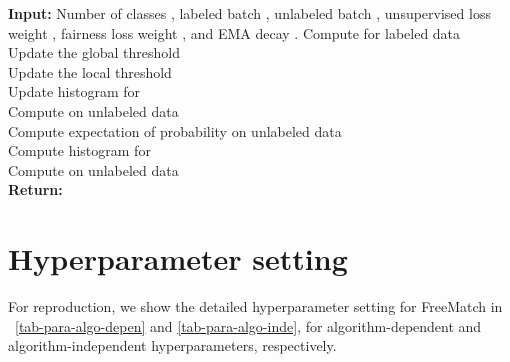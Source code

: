 \documentclass{article} \usepackage{iclr2023_conference,times}
\theoremstyle{plain}
\theoremstyle{definition}
\theoremstyle{remark}
\newcommand{\ourmethod}{FreeMatch\xspace}
\begin{document}
\begin{algorithm}[h]
\caption{FreeMatch algorithm at -th iteration.}
\label{alg:freematch}
\begin{algorithmic}[1]
\STATE \textbf{Input:} Number of classes , labeled batch , unlabeled batch , unsupervised loss weight , fairness loss weight , and EMA decay .
\STATE Compute  for labeled data \\ 
       


\STATE Update the global threshold \\
       
\STATE Update the local threshold \\
       
\STATE Update histogram for  \\
       
\STATE 
{}
\ENDFOR 
\STATE Compute  on unlabeled data \\ 
         
\STATE Compute expectation of probability on unlabeled data \\ 
        
\STATE Compute histogram for  \\ 
       
\STATE Compute  on unlabeled data \\ 
       
\STATE \textbf{Return:} 
\end{algorithmic}
\end{algorithm}



\section{Hyperparameter setting}
\label{append-hyper}

For reproduction, we show the detailed hyperparameter setting for \ourmethod in \tablename~\ref{tab-para-algo-depen} and \ref{tab-para-algo-inde}, for algorithm-dependent and algorithm-independent hyperparameters, respectively.
\end{document}
